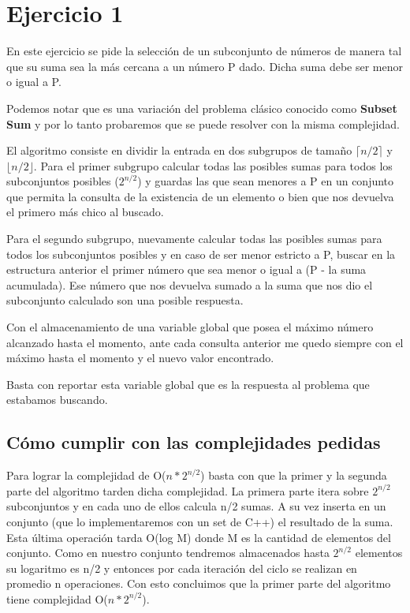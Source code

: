 \section{Ejercicio 1}

En este ejercicio se pide la selección de un subconjunto de números de manera tal que su suma sea la más cercana a un número P dado.
Dicha suma debe ser menor o igual a P.

Podemos notar que es una variación del problema clásico conocido como \textbf{Subset Sum} y por lo tanto probaremos que se puede resolver con la misma complejidad.

El algoritmo consiste en dividir la entrada en dos subgrupos de tamaño $\lceil n/2 \rceil$ y $\lfloor n/2 \rfloor$.
Para el primer subgrupo calcular todas las posibles sumas para todos los subconjuntos posibles ($2^{n/2}$) y guardas las que sean menores a P en un conjunto que permita la consulta de la existencia de un elemento o bien que nos devuelva el primero más chico al buscado.

Para el segundo subgrupo, nuevamente calcular todas las posibles sumas para todos los subconjuntos posibles y en caso de ser menor estricto a P, buscar en la estructura anterior el primer número que sea menor o igual a (P - la suma acumulada). Ese número que nos devuelva sumado a la suma que nos dio el subconjunto calculado son una posible respuesta. 

Con el almacenamiento de una variable global que posea el máximo número alcanzado hasta el momento, ante cada consulta anterior me quedo siempre con el máximo hasta el momento y el nuevo valor encontrado. 

Basta con reportar esta variable global que es la respuesta al problema que estabamos buscando.

\subsection{Cómo cumplir con las complejidades pedidas}

Para lograr la complejidad de O($n * 2 ^{n/2}$) basta con que la primer y la segunda parte del algoritmo tarden dicha complejidad.
La primera parte itera sobre $2 ^{n/2}$ subconjuntos y en cada uno de ellos calcula n/2 sumas. A su vez inserta en un conjunto (que lo implementaremos con un set de C++) el resultado de la suma. Esta última operación tarda O(log M) donde M es la cantidad de elementos del conjunto. Como en nuestro conjunto tendremos almacenados hasta $2 ^{n/2}$ elementos su logaritmo es n/2 y entonces por cada iteración del ciclo se realizan en promedio n operaciones.
Con esto concluimos que la primer parte del algoritmo tiene complejidad  O($n * 2 ^{n/2}$).

